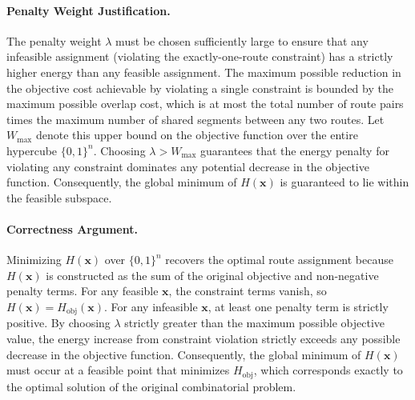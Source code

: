 \documentclass[12pt]{article}
\begin{document}
\paragraph{Penalty Weight Justification.}
The penalty weight $\lambda$ must be chosen sufficiently large to ensure that any infeasible assignment (violating the exactly-one-route constraint) has a strictly higher energy than any feasible assignment. The maximum possible reduction in the objective cost achievable by violating a single constraint is bounded by the maximum possible overlap cost, which is at most the total number of route pairs times the maximum number of shared segments between any two routes. Let $W_{\max}$ denote this upper bound on the objective function over the entire hypercube $\{0,1\}^n$. Choosing $\lambda > W_{\max}$ guarantees that the energy penalty for violating any constraint dominates any potential decrease in the objective function. Consequently, the global minimum of $H(\mathbf{x})$ is guaranteed to lie within the feasible subspace.

\paragraph{Correctness Argument.}
Minimizing $H(\mathbf{x})$ over $\{0,1\}^n$ recovers the optimal route assignment because $H(\mathbf{x})$ is constructed as the sum of the original objective and non-negative penalty terms. For any feasible $\mathbf{x}$, the constraint terms vanish, so $H(\mathbf{x}) = H_{\text{obj}}(\mathbf{x})$. For any infeasible $\mathbf{x}$, at least one penalty term is strictly positive. By choosing $\lambda$ strictly greater than the maximum possible objective value, the energy increase from constraint violation strictly exceeds any possible decrease in the objective function. Consequently, the global minimum of $H(\mathbf{x})$ must occur at a feasible point that minimizes $H_{\text{obj}}$, which corresponds exactly to the optimal solution of the original combinatorial problem.
\end{document}
